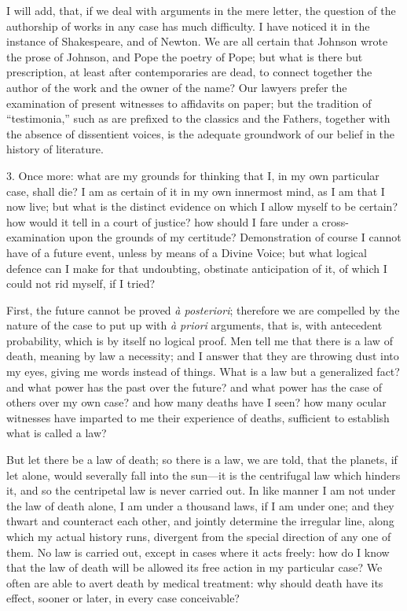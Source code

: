 I will add, that, if we deal with arguments in the mere letter, the
question of the authorship of works in any case has much difficulty. I
have noticed it in the instance of Shakespeare, and of Newton. We are
all certain that Johnson wrote the prose of Johnson, and Pope the
poetry of Pope; but what is there but prescription, at least after
contemporaries are dead, to connect together the author of the work
and the owner of the name? Our lawyers prefer the examination of
present witnesses to affidavits on paper; but the tradition of ``testimonia,''
such as are prefixed to the classics and the Fathers, together with
the absence of dissentient voices, is the adequate groundwork of our
belief in the history of literature.

3. Once more: what are my grounds for thinking that I, in my own
particular case, shall die? I am as certain of it in my own innermost
mind, as I am that I now live; but what is the distinct evidence on
which I allow myself to be certain? how would it tell in a court of
justice? how should I fare under a cross-examination upon the grounds
of my certitude? Demonstration of course I cannot have of a
future event, unless by means of a Divine Voice; but what logical
defence can I make for that undoubting, obstinate anticipation of it,
of which I could not rid myself, if I tried?

First, the future cannot be proved \emph{à posteriori}; therefore
we are compelled by the nature of the case to put up with \emph{à priori}
arguments, that is, with antecedent probability, which is by itself no
logical proof. Men tell me that there is a law of death, meaning by
law a necessity; and I answer that they are throwing dust into my
eyes, giving me words instead of things. What is a law but a
generalized fact? and what power has the past over the future? and
what power has the case of others over my own case? and how many
deaths have I seen? how many ocular witnesses have imparted to me
their experience of deaths, sufficient to establish what is called a
law?

But let there be a law of death; so there is a law, we are told,
that the planets, if let alone, would severally fall into the sun—it
is the centrifugal law which hinders it, and so the centripetal law is
never carried out. In like manner I am not under the law of death
alone, I am under a thousand laws, if I am under one; and they thwart
and counteract each other, and jointly determine the irregular line,
along which my actual history runs, divergent from the special
direction of any one of them. No law is carried out, except in cases
where it acts freely: how do I know that the law of death will be
allowed its free action in my particular case? We often are able to
avert death by medical treatment: why should death have its
effect, sooner or later, in every case conceivable?

